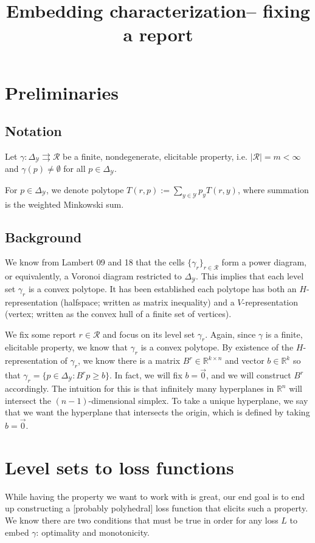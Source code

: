 \documentclass[12pt]{article}
\title{Embedding characterization-- fixing a report}
\date{}
\newcommand{\reals}{\mathbb{R}}
\newcommand{\simplex}{\Delta_\Y}
\newcommand{\R}{\mathcal{R}}
\newcommand{\Y}{\mathcal{Y}}
\newcommand{\toto}{\rightrightarrows}
\begin{document}
\maketitle
\section{Preliminaries}
\subsection*{Notation}
Let $\gamma:\simplex \toto \R$ be a finite, nondegenerate, elicitable property, i.e. $|\R| = m < \infty$ and $\gamma(p) \neq \emptyset$ for all $p \in \simplex$.

For $p \in \simplex$, we denote polytope $T(r,p) := \sum_{y \in \Y}p_y T(r,y)$, where summation is the weighted Minkowski sum.

\subsection*{Background}
We know from Lambert 09 and 18 that the cells $\{\gamma_r\}_{r \in \R}$ form a power diagram, or equivalently, a Voronoi diagram restricted to $\simplex$.
This implies that each level set $\gamma_r$ is a convex polytope.
It has been established each polytope has both an $H$-representation (halfspace; written as matrix inequality) and a $V$-representation (vertex; written as the convex hull of a finite set of vertices).

We fix some report $r \in \R$ and focus on its level set $\gamma_r$.
Again, since $\gamma$ is a finite, elicitable property, we know that $\gamma_r$ is a convex polytope.
By existence of the $H$-representation of $\gamma_r$, we know there is a matrix $B^r \in \reals^{k \times n}$ and vector $b \in \reals^k$ so that $\gamma_r = \{p \in \simplex : B^r p \geq b\}$.
In fact, we will fix $b = \vec 0$, and we will construct $B^r$ accordingly.
The intuition for this is that infinitely many hyperplanes in $\reals^n$ will intersect the $(n-1)$-dimensional simplex.
To take a unique hyperplane, we say that we want the hyperplane that intersects the origin, which is defined by taking $b = \vec 0$.


\section{Level sets to loss functions}
While having the property we want to work with is great, our end goal is to end up constructing a [probably polyhedral] loss function that elicits such a property.
We know there are two conditions that must be true in order for any loss $L$ to embed $\gamma$: optimality and monotonicity.
\end{document}

